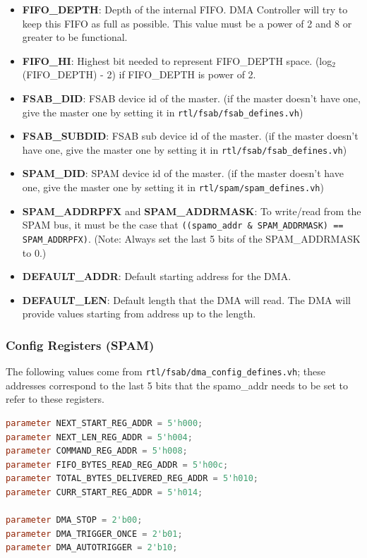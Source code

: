 \documentclass[10pt]{report}
\begin{document}
\begin{itemize}
\item{\textbf{FIFO\_DEPTH}: Depth of the internal FIFO. DMA Controller will
try to keep this FIFO as full as possible. This value must be a power of 2
and 8 or greater to be functional.}
\item{\textbf{FIFO\_HI}: Highest bit needed to represent FIFO\_DEPTH space.
(log${}_2$(FIFO\_DEPTH) - 2) if FIFO\_DEPTH is power of 2.}
\item{\textbf{FSAB\_DID}: FSAB device id of the master. (if the master
doesn't have one, give the master one by setting it in
\texttt{rtl/fsab/fsab\_defines.vh})}
\item{\textbf{FSAB\_SUBDID}: FSAB sub device id of the master. (if the
master doesn't have one, give the master one by setting it in
\texttt{rtl/fsab/fsab\_defines.vh})}
\item{\textbf{SPAM\_DID}: SPAM device id of the master. (if the master
doesn't have one, give the master one by setting it in
\texttt{rtl/spam/spam\_defines.vh})}

\item{\textbf{SPAM\_ADDRPFX} and \textbf{SPAM\_ADDRMASK}: To write/read from
the SPAM bus, it must be the case that \texttt{((spamo\_addr \& SPAM\_ADDRMASK) ==
SPAM\_ADDRPFX)}.  (Note: Always set the last 5 bits of the SPAM\_ADDRMASK to
0.)}

\item{\textbf{DEFAULT\_ADDR}: Default starting address for the DMA.}

\item{\textbf{DEFAULT\_LEN}: Default length that the DMA will read. The DMA will
provide values starting from address up to the length.}

\end{itemize}

\subsubsection{Config Registers (SPAM)}

The following values come from \texttt{rtl/fsab/dma\_config\_defines.vh};
these addresses correspond to the last 5 bits that the spamo\_addr needs to
be set to refer to these registers.

\begin{lstlisting}[basicstyle=\footnotesize,language=Verilog]
parameter NEXT_START_REG_ADDR = 5'h000;
parameter NEXT_LEN_REG_ADDR = 5'h004;
parameter COMMAND_REG_ADDR = 5'h008;
parameter FIFO_BYTES_READ_REG_ADDR = 5'h00c;
parameter TOTAL_BYTES_DELIVERED_REG_ADDR = 5'h010;
parameter CURR_START_REG_ADDR = 5'h014; 

parameter DMA_STOP = 2'b00;
parameter DMA_TRIGGER_ONCE = 2'b01;
parameter DMA_AUTOTRIGGER = 2'b10;
\end{lstlisting}
\end{document}
